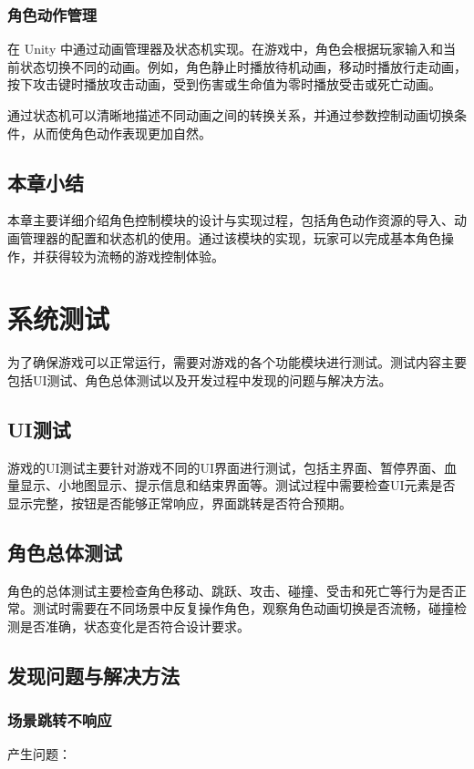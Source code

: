 \documentclass[12pt]{graduate-design-manual}
\begin{document}
\subsubsection{角色动作管理}
在 Unity 中通过动画管理器及状态机实现。在游戏中，角色会根据玩家输入和当前状态切换不同的动画。例如，角色静止时播放待机动画，移动时播放行走动画，按下攻击键时播放攻击动画，受到伤害或生命值为零时播放受击或死亡动画。

通过状态机可以清晰地描述不同动画之间的转换关系，并通过参数控制动画切换条件，从而使角色动作表现更加自然。

\subsection{本章小结}
本章主要详细介绍角色控制模块的设计与实现过程，包括角色动作资源的导入、动画管理器的配置和状态机的使用。通过该模块的实现，玩家可以完成基本角色操作，并获得较为流畅的游戏控制体验。

\section{系统测试}
为了确保游戏可以正常运行，需要对游戏的各个功能模块进行测试。测试内容主要包括UI测试、角色总体测试以及开发过程中发现的问题与解决方法。

\subsection{UI测试}
游戏的UI测试主要针对游戏不同的UI界面进行测试，包括主界面、暂停界面、血量显示、小地图显示、提示信息和结束界面等。测试过程中需要检查UI元素是否显示完整，按钮是否能够正常响应，界面跳转是否符合预期。

\subsection{角色总体测试}
角色的总体测试主要检查角色移动、跳跃、攻击、碰撞、受击和死亡等行为是否正常。测试时需要在不同场景中反复操作角色，观察角色动画切换是否流畅，碰撞检测是否准确，状态变化是否符合设计要求。

\subsection{发现问题与解决方法}
\subsubsection{场景跳转不响应}
产生问题：
\end{document}
